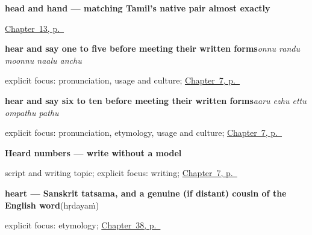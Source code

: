 \noindent\begin{minipage}[t]{\linewidth}
\raggedright
\textbf{head and hand — matching Tamil's native pair almost exactly}\enspace\emph{ }\par
\footnotesize \hyperref[ch:ml-head-and-hand]{Chapter~13, p.~\pageref*{ch:ml-head-and-hand}}
\end{minipage}\par\smallskip

\noindent\begin{minipage}[t]{\linewidth}
\raggedright
\textbf{hear and say one to five before meeting their written forms}\enspace\emph{onnu randu moonnu naalu anchu}\par
\footnotesize explicit focus: pronunciation, usage and culture; \hyperref[ch:ml-numbers-one-to-ten]{Chapter~7, p.~\pageref*{ch:ml-numbers-one-to-ten}}
\end{minipage}\par\smallskip

\noindent\begin{minipage}[t]{\linewidth}
\raggedright
\textbf{hear and say six to ten before meeting their written forms}\enspace\emph{aaru ezhu ettu ompathu pathu}\par
\footnotesize explicit focus: pronunciation, etymology, usage and culture; \hyperref[ch:ml-numbers-one-to-ten]{Chapter~7, p.~\pageref*{ch:ml-numbers-one-to-ten}}
\end{minipage}\par\smallskip

\noindent\begin{minipage}[t]{\linewidth}
\raggedright
\textbf{Heard numbers — write without a model}\par
\footnotesize script and writing topic; explicit focus: writing; \hyperref[ch:ml-numbers-one-to-ten]{Chapter~7, p.~\pageref*{ch:ml-numbers-one-to-ten}}
\end{minipage}\par\smallskip

\noindent\begin{minipage}[t]{\linewidth}
\raggedright
\textbf{heart — Sanskrit tatsama, and a genuine (if distant) cousin of the English word}\enspace\emph{}\enspace(hṛdayaṁ)\par
\footnotesize explicit focus: etymology; \hyperref[ch:ml-two-hearts]{Chapter~38, p.~\pageref*{ch:ml-two-hearts}}
\end{minipage}\par\smallskip

